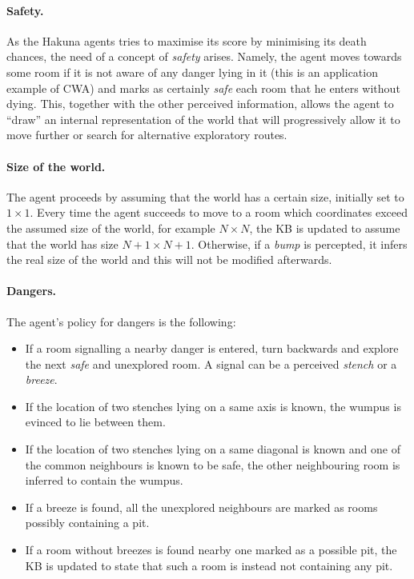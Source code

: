 \documentclass{llncs}
\begin{document}
\paragraph{Safety.} As the Hakuna agents tries to maximise its score by minimising its death chances, the need of a concept of \emph{safety} arises.
Namely, the agent moves towards some room if it is not aware of any danger lying in it (this is an application example of CWA) and marks as certainly \emph{safe} each room that he enters without dying.
This, together with the other perceived information, allows the agent to ``draw'' an internal representation of the world that will progressively allow it to move further or search for alternative exploratory routes.

\paragraph{Size of the world.} The agent proceeds by assuming that the world has a certain size, initially set to $1 \times 1$.
Every time the agent succeeds to move to a room which coordinates exceed the assumed size of the world, for example $N \times N$, the KB is updated to assume that the world has size $N+1 \times N+1$.
Otherwise, if a \emph{bump} is percepted, it infers the real size of the world and this will not be modified afterwards.

\paragraph{Dangers.} The agent's policy for dangers is the following:
\begin{itemize}
	\item If a room signalling a nearby danger is entered, turn backwards and explore the next \emph{safe} and unexplored room. A signal can be a perceived \emph{stench} or a \emph{breeze}.
	\item If the location of two stenches lying on a same axis is known, the wumpus is evinced to lie between them.
	\item If the location of two stenches lying on a same diagonal is known and one of the common neighbours is known to be safe, the other neighbouring room is inferred to contain the wumpus.
	\item If a breeze is found, all the unexplored neighbours are marked as rooms possibly containing a pit.
	\item If a room without breezes is found nearby one marked as a possible pit, the KB is updated to state that such a room is instead not containing any pit. 
\end{itemize}
\end{document}
